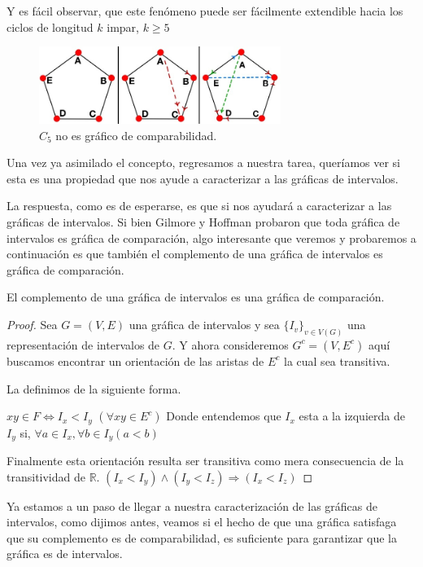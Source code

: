     Y es fácil observar, que este fenómeno puede ser fácilmente extendible hacia los ciclos de longitud $k$ impar, $k\geq 5$

\begin{figure}[H]
  \centering
  \includegraphics[width=0.7\textwidth]{recursos/capturas/207.jpg}
  \caption{$C_5$ no es gráfico de comparabilidad.}
  \label{fig:207}
\end{figure}

Una vez ya asimilado el concepto, regresamos a nuestra tarea, queríamos ver si esta es una propiedad que nos ayude a caracterizar a las gráficas de intervalos. 

La respuesta, como es de esperarse, es que si nos ayudará a caracterizar a las gráficas de intervalos.
Si bien Gilmore y Hoffman probaron que toda gráfica de intervalos es gráfica de comparación, algo interesante que veremos y probaremos a continuación es que también el complemento de una gráfica de intervalos es gráfica de comparación.

\begin{teorema}
    \label{teo:202}
    El complemento de una gráfica de intervalos es una gráfica de comparación.
\end{teorema}

\begin{proof}
    Sea $G=(V,E)$ una gráfica de intervalos y sea $\{I_v \}_{v\in V(G)}$ una representación de intervalos de $G$. Y ahora consideremos $G^c =(V, E^c)$ aquí buscamos encontrar un orientación de las aristas de $E^c$ la cual sea transitiva. 
    
    La definimos de la siguiente forma.
    
    $xy\in F \iff I_x<I_y$ $(\forall xy\in E^c)$
    Donde entendemos que $I_x$ esta a la izquierda de $I_y$ si,
    $\forall a\in I_x, \forall b \in I_y(a<b)$

    Finalmente esta orientación resulta ser transitiva como mera consecuencia de la transitividad de $\mathbb{R}$.
    $(I_x < I_y) \wedge (I_y < I_z) \Rightarrow (I_x<I_z) $
\end{proof}

Ya estamos a un paso de llegar a nuestra caracterización de las gráficas de intervalos, como dijimos antes, veamos si el hecho de que una gráfica satisfaga que su complemento es de comparabilidad, es suficiente para garantizar que la gráfica es de intervalos. 

